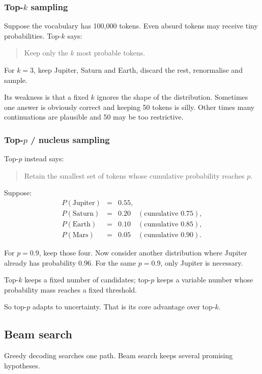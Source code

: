 \subsubsection{Top-\texorpdfstring{$k$}{k} sampling}
\label{subsec:modern-topk}
Suppose the vocabulary has 100,000 tokens.
Even absurd tokens may receive tiny probabilities.
Top-$k$ says:

\begin{quote}
Keep only the $k$ most probable tokens.
\end{quote}

For $k=3$, keep Jupiter, Saturn and Earth, discard the rest, renormalise and sample.

Its weakness is that a fixed $k$ ignores the shape of the distribution.
Sometimes one answer is obviously correct and keeping 50 tokens is silly.
Other times many continuations are plausible and 50 may be too restrictive.

\subsubsection{Top-\texorpdfstring{$p$}{p} / nucleus sampling}
\label{subsec:modern-topp}
Top-$p$ instead says:

\begin{quote}
Retain the smallest set of tokens whose cumulative probability reaches $p$.
\end{quote}

Suppose:
\[
\begin{array}{rcl}
P(\text{Jupiter})&=&0.55,\\
P(\text{Saturn})&=&0.20\quad(\text{cumulative }0.75),\\
P(\text{Earth})&=&0.10\quad(\text{cumulative }0.85),\\
P(\text{Mars})&=&0.05\quad(\text{cumulative }0.90).
\end{array}
\]

For $p=0.9$, keep those four.
Now consider another distribution where Jupiter already has probability $0.96$.
For the same $p=0.9$, only Jupiter is necessary.

\begin{calloutmemoryhook}
Top-$k$ keeps a fixed number of candidates; top-$p$ keeps a variable number whose probability mass reaches a fixed threshold.
\end{calloutmemoryhook}

So top-$p$ adapts to uncertainty.
That is its core advantage over top-$k$.

\subsection{Beam search}
\label{subsec:modern-beam-search}
Greedy decoding searches one path.
Beam search keeps several promising hypotheses.

